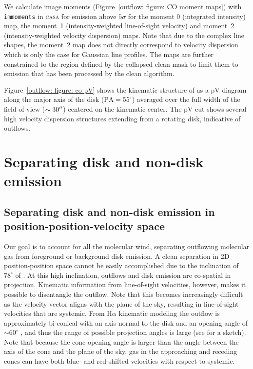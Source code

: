 We calculate image moments (Figure~\ref{outflow: figure: CO moment maps}) with \texttt{immoments} in \textsc{casa} for emission above $5\sigma$ for the moment 0 (integrated intensity) map, the moment~1 (intensity-weighted line-of-sight velocity) and moment~2 (intensity-weighted velocity dispersion) maps. Note that due to the complex line shapes, the moment~2 map does not directly correspond to velocity dispersion which is only the case for Gaussian line profiles. The maps are further constrained to the region defined by the collapsed clean mask to limit them to emission that has been processed by the clean algorithm.

Figure~\ref{outflow: figure: co pV} shows the kinematic structure of  as a pV diagram along the major axis of the disk ($\mathrm{PA} = 55^\circ$) averaged over the full width of the field of view ($\sim 30^{\prime\prime}$) centered on the kinematic center. The pV cut shows several high velocity dispersion structures extending from a rotating disk, indicative of outflows.



\section{Separating disk and non-disk emission}
\label{outflow: section: disk separation}



\subsection{Separating disk and non-disk emission in position-position-velocity space}
\label{outflow: subsection: ppV separation}

Our goal is to account for all the molecular wind, separating outflowing molecular gas from foreground or background disk emission. A clean separation in 2D position-position space cannot be easily accomplished due to the inclination of $78^\circ$ of . At this high inclination, outflows and disk emission are co-spatial in projection. Kinematic information from line-of-sight velocities, however, makes it possible to disentangle the outflow. Note that this becomes increasingly difficult as the velocity vector aligns with the plane of the sky, resulting in line-of-sight velocities that are systemic. From H$\alpha$ kinematic modeling the  outflow is approximately bi-conical with an axis normal to the disk and an opening angle of $\sim60^\circ$ \citep{Westmoquette:2011bp}, and thus the range of possible projection angles is large (see \citealt{2015ApJ...801...63M} for a sketch). Note that because the cone opening angle is larger than the angle between the axis of the cone and the plane of the sky, gas in the approaching and receding cones can have both blue- and red-shifted velocities with respect to systemic.

